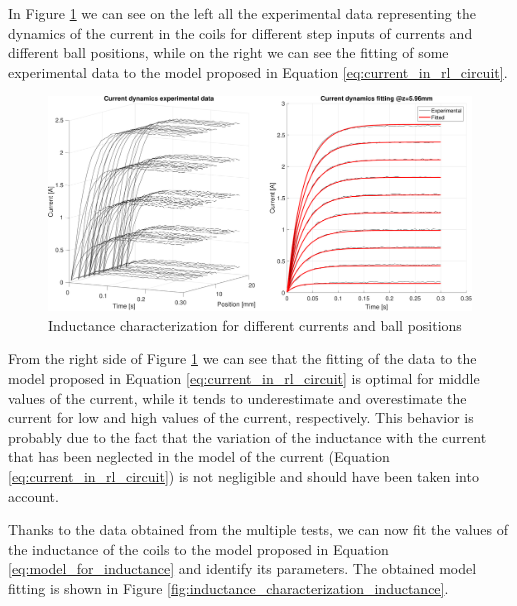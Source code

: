 In Figure \ref{fig:inductance_characterization_currents} we can see on the left all the experimental data representing the dynamics of the current in the coils for different step inputs of currents and different ball positions, while on the right we can see the fitting of some experimental data to the model proposed in Equation \ref{eq:current_in_rl_circuit}.

\begin{figure}[H]
    \centering
    \includegraphics[width=1\textwidth]{img/MATLAB/identification/currents.pdf}
    \caption{Inductance characterization for different currents and ball positions}
    \label{fig:inductance_characterization_currents}
\end{figure}

From the right side of Figure \ref{fig:inductance_characterization_currents} we can see that the fitting of the data to the model proposed in Equation \ref{eq:current_in_rl_circuit} is optimal for middle values of the current, while it tends to underestimate and overestimate the current for low and high values of the current, respectively.
This behavior is probably due to the fact that the variation of the inductance with the current that has been neglected in the model of the current (Equation \ref{eq:current_in_rl_circuit}) is not negligible and should have been taken into account.

Thanks to the data obtained from the multiple tests, we can now fit the values of the inductance of the coils to the model proposed in Equation \ref{eq:model_for_inductance} and identify its parameters.
The obtained model fitting is shown in Figure \ref{fig:inductance_characterization_inductance}.

